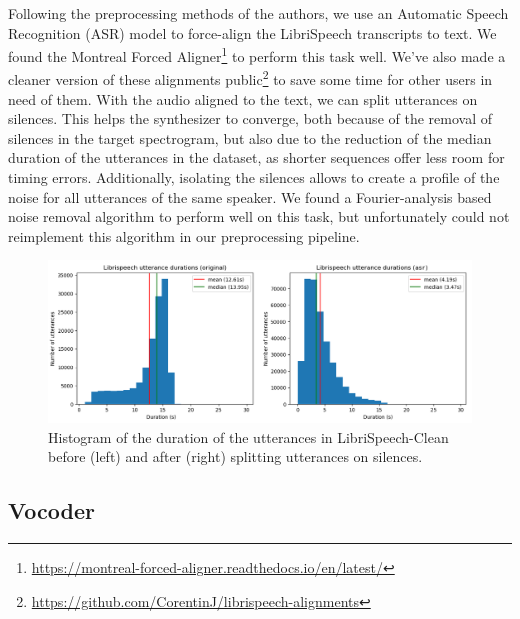 \documentclass[a4paper, oneside, 12pt, english]{article}
\begin{document}
Following the preprocessing methods of the authors, we use an Automatic Speech Recognition (ASR) model to force-align the LibriSpeech transcripts to text. We found the Montreal Forced Aligner\footnote{\url{https://montreal-forced-aligner.readthedocs.io/en/latest/}} to perform this task well. We've also made a cleaner version of these alignments public\footnote{\url{https://github.com/CorentinJ/librispeech-alignments}} to save some time for other users in need of them. With the audio aligned to the text, we can split utterances on silences. This helps the synthesizer to converge, both because of the removal of silences in the target spectrogram, but also due to the reduction of the median duration of the utterances in the dataset, as shorter sequences offer less room for timing errors. Additionally, isolating the silences allows to create a profile of the noise for all utterances of the same speaker. We found a Fourier-analysis based noise removal algorithm to perform well on this task, but unfortunately could not reimplement this algorithm in our preprocessing pipeline.

\begin{figure}[h]
	\centering
	\includegraphics[width=\linewidth]{images/librispeech_durations.png}
	\caption{Histogram of the duration of the utterances in LibriSpeech-Clean before (left) and after (right) splitting utterances on silences.}
	\label{librispeech_durations}
\end{figure}





\subsection{Vocoder} \label{vocoder}
\end{document}
